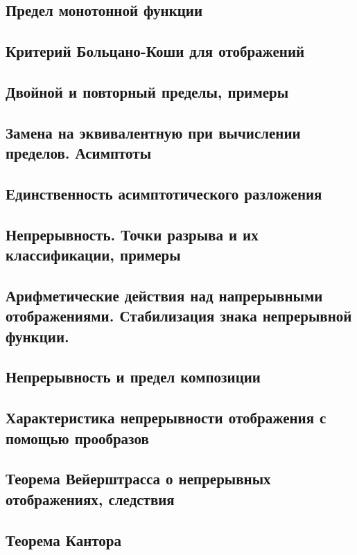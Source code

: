 \subsection{Предел монотонной функции}

\skip
\subsection{Критерий Больцано-Коши для отображений}

\skip
\subsection{Двойной и повторный пределы, примеры}

\skip
\subsection{Замена на эквивалентную при вычислении пределов. Асимптоты}

\skip
\subsection{Единственность асимптотического разложения}

\skip
\subsection{Непрерывность. Точки разрыва и их классификации, примеры}

\skip
\subsection{Арифметические действия над напрерывными отображениями. Стабилизация знака непрерывной функции.}

\skip
\subsection{Непрерывность и предел композиции}

\skip
\subsection{Характеристика непрерывности отображения с помощью прообразов}

\skip
\subsection{Теорема Вейерштрасса о непрерывных отображениях, следствия}

\skip
\subsection{Теорема Кантора}

\skip
